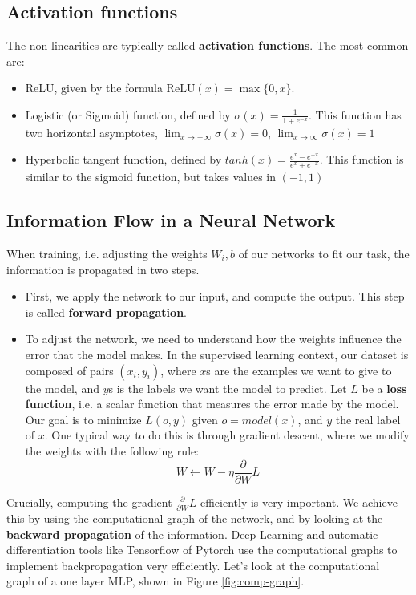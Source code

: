 \documentclass[oneside]{book}
\theoremstyle{definition}
\theoremstyle{plain}
\begin{document}
\subsection{Activation functions}
The non linearities are typically called \textbf{activation functions}. The most common are:
\begin{itemize}
    \item ReLU, given by the formula $\text{ReLU}(x)=\max\{0, x\}$. 
    \item Logistic (or Sigmoid) function, defined by $\sigma(x)=\frac{1}{1+e^{-x}}$. This function has two horizontal asymptotes, $\lim_{x\to -\infty} \sigma(x)=0$, $\lim_{x\to \infty} \sigma(x)=1$  
    \item Hyperbolic tangent function, defined by $tanh(x)=\frac{e^{x}- e^{-x}}{e^{x}+ e^{-x}}$. This function is similar to the sigmoid function, but takes values in $(-1, 1)$
\end{itemize}
\subsection{Information Flow in a Neural Network}

When training, i.e. adjusting the weights $W_i, b$ of our networks to fit our task, the information is propagated in two steps.
\begin{itemize}
    \item First, we apply the network to our input, and compute the output. This step is called \textbf{forward propagation}.
    \item To adjust the network, we need to understand how the weights influence the error that the model makes.  In the supervised learning context, our dataset is composed of pairs $(x_i,y_i)$, where $x$s are the examples we want to give to the model, and $y$s is the labels we want the model to predict. Let $L$ be a \textbf{loss function}, i.e. a scalar function that measures the error made by the model.
Our goal is to minimize $L(o ,y)$ given $o =model(x)$, and $y$ the real label of $x$. 
One typical way to do this is through gradient descent, where we modify the weights with the following rule:
\[
    W\leftarrow W- \eta \frac{\partial}{\partial W} L
\]

\end{itemize}
Crucially, computing the gradient $\frac{\partial}{\partial W}L$ efficiently is very important. We achieve this by using the computational graph of the network, and by looking at the \textbf{backward propagation} of the information. Deep Learning and automatic differentiation tools like Tensorflow of Pytorch use the computational graphs to implement backpropagation very efficiently.
Let's look at the computational graph of a one layer MLP, shown in Figure \ref{fig:comp-graph}. 
\end{document}
